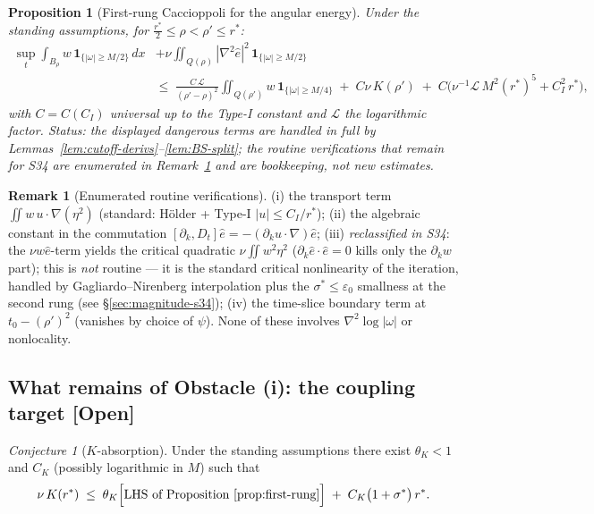 \documentclass[11pt]{article}
\newtheorem{proposition}[theorem]{Proposition}
\theoremstyle{definition}
\newtheorem{remark}[theorem]{Remark}
\theoremstyle{remark}
\newtheorem{conjecture}[theorem]{Conjecture}
\begin{document}
\begin{proposition}[First-rung Caccioppoli for the angular energy]
  \label{prop:first-rung}
  Under the standing assumptions, for
  $\tfrac{r^*}{2}\leq\rho<\rho'\leq r^*$:
  \begin{align*}
    \sup_{t}\int_{B_\rho} w\,\mathbf{1}_{\{|\omega|\geq M/2\}}\,dx
    &+ \nu\iint_{Q(\rho)}|\nabla^2\hat{e}|^2\,\mathbf{1}_{\{|\omega|\geq M/2\}} \\
    &\leq\; \frac{C\,\mathcal{L}}{(\rho'-\rho)^2}
      \iint_{Q(\rho')} w\,\mathbf{1}_{\{|\omega|\geq M/4\}}
      \;+\; C\nu\,K(\rho')
      \;+\; C\bigl(\nu^{-1}\mathcal{L}\,M^2(r^*)^5 + C_I^2\,r^*\bigr),
  \end{align*}
  with $C = C(C_I)$ universal up to the Type-I constant and
  $\mathcal{L}$ the logarithmic factor. \emph{Status: the displayed
  dangerous terms are handled in full by
  Lemmas~\ref{lem:cutoff-derivs}--\ref{lem:BS-split}; the routine
  verifications that remain for S34 are enumerated in
  Remark~\ref{rem:routine-list} and are bookkeeping, not new estimates.}
\end{proposition}

\begin{remark}[Enumerated routine verifications]\label{rem:routine-list}
  (i) the transport term $\iint w\,u\cdot\nabla(\eta^2)$ (standard:
  H\"older + Type-I $|u|\leq C_I/r^*$); (ii) the algebraic constant in the
  commutation $[\partial_k, D_t]\hat{e} = -(\partial_k u\cdot\nabla)\hat{e}$;
  (iii) \emph{reclassified in S34}: the $\nu w\hat{e}$-term yields the
  critical quadratic $\nu\iint w^2\eta^2$ ($\partial_k\hat{e}\cdot\hat{e}=0$
  kills only the $\partial_k w$ part); this is \emph{not} routine --- it is
  the standard critical nonlinearity of the iteration, handled by
  Gagliardo--Nirenberg interpolation plus the $\sigma^*\leq\varepsilon_0$
  smallness at the second rung (see \S\ref{sec:magnitude-s34}); (iv) the
  time-slice boundary term at $t_0-(\rho')^2$ (vanishes by choice of
  $\psi$). None of these involves $\nabla^2\log|\omega|$ or nonlocality.
\end{remark}

\subsection{What remains of Obstacle (i): the coupling target [Open]}

\begin{conjecture}[$K$-absorption]\label{target:K-absorption}
  Under the standing assumptions there exist $\theta_K<1$ and $C_K$
  (possibly logarithmic in $M$) such that
  \[
    \nu\,K(r^*) \;\leq\; \theta_K\Bigl[\text{LHS of
    Proposition~\ref{prop:first-rung}}\Bigr]
    \;+\; C_K\bigl(1 + \sigma^*\bigr)\,r^*.
  \]
\end{conjecture}
\end{document}

